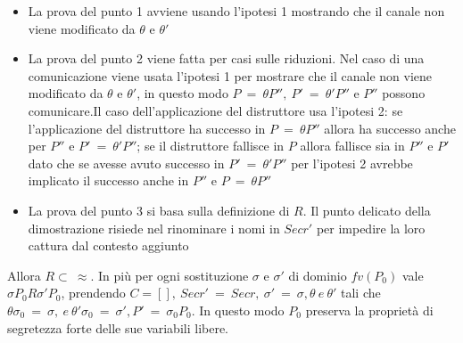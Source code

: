 \documentclass[12pt]{report}
\begin{document}
\begin{itemize}
    \item La prova del punto 1 avviene usando l'ipotesi 1 mostrando che il canale non viene modificato da $\theta$ e $\theta'$
    \item La prova del punto 2 viene fatta per casi sulle riduzioni. Nel caso di una comunicazione viene usata l'ipotesi 1 per mostrare che il canale non viene modificato da $\theta$ e $\theta'$, in questo modo $ P\ =\ \theta P'',\ P'\ =\ \theta'P'' $ e $P''$ possono comunicare.Il caso dell'applicazione del distruttore usa l'ipotesi 2: se l'applicazione del distruttore ha successo in $P\ =\ \theta P''$ allora ha successo anche per $P''$ e $P'\ =\ \theta'P''$; se il distruttore fallisce in $P$ allora fallisce sia in $P''$ e $P'$ dato che se avesse avuto successo in $P'\ =\ \theta'P''$ per l'ipotesi 2 avrebbe implicato il successo anche in $P''$ e $P\ =\ \theta P''$
    \item La prova del punto 3 si basa sulla definizione di $R$. Il punto delicato della dimostrazione risiede nel rinominare i nomi in $Secr'$ per impedire la loro cattura dal contesto aggiunto
\end{itemize}
Allora $R \subset \ \approx$. In più per ogni sostituzione $\sigma$ e $\sigma'$ di dominio $fv(P_0)$ vale $\sigma P_0 R \sigma'P_0$, prendendo $C=[],\ Secr'\ =\ Secr,\ \sigma'\ =\ \sigma, \theta \ e\ \theta'$ tali che $\theta \sigma_0 \ =\ \sigma,\ e\ \theta'\sigma_0\ =\ \sigma', P'\ =\ \sigma_0 P_0$. In questo modo $P_0$ preserva la proprietà di segretezza forte delle sue variabili libere.
\end{document}
